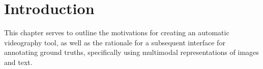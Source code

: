 \documentclass{l4proj}
\begin{document}
\def\consentname {Stergious Aji} %
\def\consentdate {\today} %
\educationalconsent


\tableofcontents
%
%
%

%
%
%
%
\chapter{Introduction}

This chapter serves to outline the motivations for creating an automatic videography tool, as well as the rationale for a subsequent interface for annotating ground truths, specifically using multimodal representations of images and text. 
\end{document}
